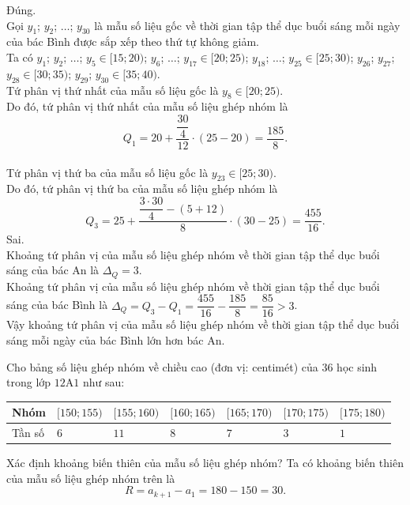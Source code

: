 \begin{ex}
{\begin{itemchoice}
			\itemch Đúng. \\
			Gọi $y_1$; $y_2$; $\ldots$; $y_{30}$ là mẫu số liệu gốc về thời gian tập thể dục buổi sáng mỗi ngày của bác Bình được sắp xếp theo thứ tự không giảm. \\
			Ta có $y_1$; $y_2$; $\ldots$; $y_5 \in [15; 20)$; $y_6$; $\ldots$; $y_{17} \in [20; 25)$; $y_{18}$; $\ldots$; $y_{25} \in [25; 30)$; $y_{26}$; $y_{27}$; $y_{28} \in [30; 35)$; $y_{29}$; $y_{30} \in [35; 40)$.\\
			Tứ phân vị thứ nhất của mẫu số liệu gốc là $y_8 \in [20; 25)$. \\
			Do đó, tứ phân vị thứ nhất của mẫu số liệu ghép nhóm là 
			\[Q_1 = 20 + \dfrac{\dfrac{30}{4}}{12} \cdot (25 - 20) = \dfrac{185}{8}.\] \\
			Tứ phân vị thứ ba của mẫu số liệu gốc là $y_{23} \in [25; 30)$. \\
			Do đó, tứ phân vị thứ ba của mẫu số liệu ghép nhóm là 
			\[Q_3 = 25 + \dfrac{\dfrac{3 \cdot 30}{4} - (5 + 12) }{8} \cdot (30 - 25) = \dfrac{455}{16}.\] 
			\itemch Sai.\\
			 Khoảng tứ phân vị của mẫu số liệu ghép nhóm về thời gian tập thể dục buổi sáng của bác An là $\Delta_Q = 3$. \\
			 Khoảng tứ phân vị của mẫu số liệu ghép nhóm về thời gian tập thể dục buổi sáng của bác Bình là $\Delta_Q = Q_3 - Q_1 = \dfrac{455}{16} - \dfrac{185}{8} = \dfrac{85}{16} > 3$. \\
			 Vậy khoảng tứ phân vị của mẫu số liệu ghép nhóm về thời gian tập thể dục buổi sáng mỗi ngày của bác Bình lớn hơn bác An.
		\end{itemchoice}
	}
\end{ex}

\begin{ex}%
	Cho bảng số liệu ghép nhóm về chiều cao (đơn vị: centimét) của $36$ học sinh trong lớp $12$A$1$ như sau:
	\begin{center}
		\begin{tabular}{|>{\centering\arraybackslash}m{2cm}|>{\centering\arraybackslash}m{2cm}|>{\centering\arraybackslash}m{2cm}|>{\centering\arraybackslash}m{2cm}|>{\centering\arraybackslash}m{2cm}|>{\centering\arraybackslash}m{2cm}|>{\centering\arraybackslash}m{2cm}|}
			\hline
			Nhóm & $[150; 155)$ & $[155; 160)$ & $[160; 165)$ & $[165; 170)$ & $[170; 175)$ & $[175; 180)$  \\ \hline
			Tần số & $6$ & $11$ & $8$ & $7$ & $3$ & $1$ \\ \hline
		\end{tabular}
	\end{center}
	Xác định khoảng biến thiên của mẫu số liệu ghép nhóm?
\loigiai
{ Ta có khoảng biến thiên của mẫu số liệu ghép nhóm trên là
	\[R = a_{k + 1} - a_1 = 180 - 150 = 30.\]
}
\end{ex}

